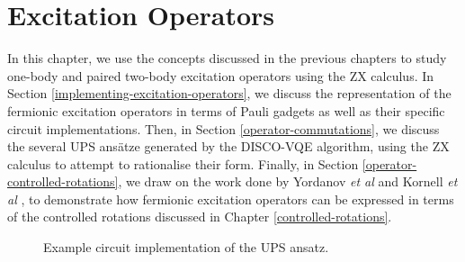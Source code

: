 \chapter{Excitation Operators}%
\label{excitation-operators}

In this chapter, we use the concepts discussed in the previous chapters to study one-body and paired two-body excitation operators using the ZX calculus. In Section \ref{implementing-excitation-operators}, we discuss the representation of the fermionic excitation operators in terms of Pauli gadgets as well as their specific circuit implementations. Then, in Section \ref{operator-commutations}, we discuss the several UPS ansätze generated by the DISCO-VQE algorithm, using the ZX calculus to attempt to rationalise their form. Finally, in Section \ref{operator-controlled-rotations}, we draw on the work done by Yordanov \textit{et al} \cite{Yordanov2020} and Kornell \textit{et al} \cite{Kornell2023}, to demonstrate how fermionic excitation operators can be expressed in terms of the controlled rotations discussed in Chapter \ref{controlled-rotations}.

\begin{figure}[H]
    \centering
    \caption{Example circuit implementation of the UPS ansatz.}
\end{figure}

